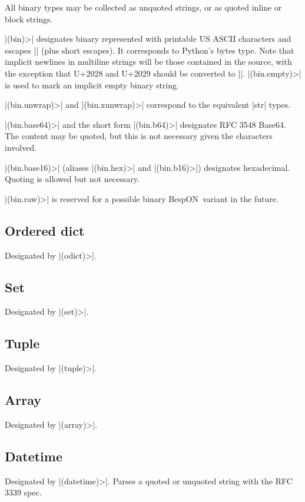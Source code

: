 \documentclass[11pt]{article}
\newcommand{\bespon}{BespON}
\begin{document}
All binary types may be collected as unquoted strings, or as quoted inline or block strings.  

|(bin)>| designates binary represented with printable US ASCII characters and escapes |\xHH| (plus short escapes).  It corresponds to Python's bytes type.  Note that implicit newlines in multiline strings will be those contained in the source, with the exception that U+2028 and U+2029 should be converted to |\n|.  |(bin.empty)>| is used to mark an implicit empty binary string.

|(bin.unwrap)>| and |(bin.xunwrap)>| correspond to the equivalent |str| types.

|(bin.base64)>| and the short form |(bin.b64)>| designates RFC 3548 Base64.  The content may be quoted, but this is not necessary given the characters involved.

|(bin.base16)>| (aliases |(bin.hex)>| and |(bin.b16)>|) designates hexadecimal.  Quoting is allowed but not necessary.

|(bin.raw)>| is reserved for a possible binary \bespon\ variant in the future.

\subsection{Ordered dict}

Designated by |(odict)>|.

\subsection{Set}

Designated by |(set)>|.

\subsection{Tuple}

Designated by |(tuple)>|.


\subsection{Array}

Designated by |(array)>|.

\subsection{Datetime}

Designated by |(datetime)>|.  Parses a quoted or unquoted string with the RFC 3339 spec.
\end{document}
